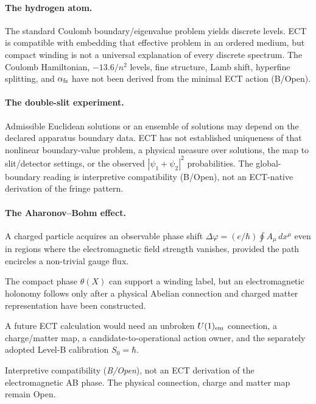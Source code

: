 \documentclass[11pt,a4paper]{article}
\begin{document}
\paragraph{The hydrogen atom.}
The standard Coulomb boundary/eigenvalue problem yields discrete levels.  ECT
is compatible with embedding that effective problem in an ordered medium, but
compact winding is not a universal explanation of every discrete spectrum.
The Coulomb Hamiltonian, $-13.6/n^2$ levels, fine structure, Lamb shift,
hyperfine splitting, and $\alpha_{\rm fs}$ have not been derived from the
minimal ECT action (B/Open).

\paragraph{The double-slit experiment.}
Admissible Euclidean solutions or an ensemble of solutions may depend on the
declared apparatus boundary data.  ECT has not established uniqueness of that
nonlinear boundary-value problem, a physical measure over solutions, the map
to slit/detector settings, or the observed $|\psi_1+\psi_2|^2$ probabilities.
The global-boundary reading is interpretive compatibility (B/Open), not an
ECT-native derivation of the fringe pattern.

\paragraph{The Aharonov--Bohm effect.}
\begin{description}[leftmargin=2.8cm, style=nextline]
\item[Standard QM.] A charged particle acquires an observable phase shift $\Delta\varphi = (e/\hbar)\oint A_\mu\,dx^\mu$ even in regions where the electromagnetic field strength vanishes, provided the path encircles a non-trivial gauge flux.
\item[ECT (conditional picture).] The compact phase $\theta(X)$ can support a
winding label, but an electromagnetic holonomy follows only after a physical
Abelian connection and charged matter representation have been constructed.
\item[Required ECT owners.] A future ECT calculation would need an unbroken
$U(1)_{\rm em}$ connection, a charge/matter map, a candidate-to-operational
action owner, and the separately adopted Level-B calibration $S_0=\hbar$.
\item[Status.] Interpretive compatibility (\emph{B/Open}), not an ECT derivation of the electromagnetic AB phase.  The physical connection, charge and matter map remain Open.
\end{description}
\end{document}
